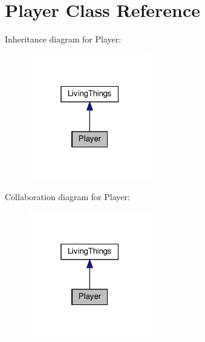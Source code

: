 \hypertarget{classPlayer}{}\section{Player Class Reference}
\label{classPlayer}


Inheritance diagram for Player\+:
\nopagebreak
\begin{figure}[H]
\begin{center}
\leavevmode
\includegraphics[width=151pt]{classPlayer__inherit__graph}
\end{center}
\end{figure}


Collaboration diagram for Player\+:
\nopagebreak
\begin{figure}[H]
\begin{center}
\leavevmode
\includegraphics[width=151pt]{classPlayer__coll__graph}
\end{center}
\end{figure}

